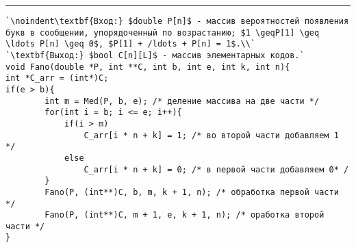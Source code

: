 \vspace{5pt} \hrule

\begin{lstlisting}[caption={Построение кодирования, близкого к оптимальному}, label=p138_calc_function, escapechar=`]
`\noindent\textbf{Вход:} $double P[n]$ - массив вероятностей появления букв в сообщении, упорядоченный по возрастанию; $1 \geqP[1] \geq \ldots P[n] \geq 0$, $P[1] + /ldots + P[n] = 1$.\\`
`\textbf{Выход:} $bool C[n][L]$ - массив элементарных кодов.`
void Fano(double *P, int **C, int b, int e, int k, int n){
int *C_arr = (int*)C;
if(e > b){
		int m = Med(P, b, e); /* деление массива на две части */
		for(int i = b; i <= e; i++){
			if(i > m) 
				C_arr[i * n + k] = 1; /* во второй части добавляем 1 */
			else
				C_arr[i * n + k] = 0; /* в первой части добавляем 0* /
		}
		Fano(P, (int**)C, b, m, k + 1, n); /* обработка первой части */
		Fano(P, (int**)C, m + 1, e, k + 1, n); /* оработка второй части */
}
\end{lstlisting}
